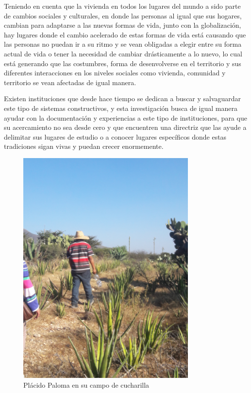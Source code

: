 Teniendo en cuenta que la vivienda en todos los lugares del mundo a sido parte de cambios sociales y culturales, en donde las personas al igual que sus hogares, cambian para adaptarse a las nuevas formas de vida, junto con la globalización, hay lugares donde el cambio acelerado de estas formas de vida está causando que las personas no puedan ir a su ritmo y se vean obligadas a elegir entre su forma actual de vida o tener la necesidad de cambiar drásticamente a lo nuevo, lo cual está generando que las costumbres, forma de desenvolverse en el territorio y sus diferentes interacciones en los niveles sociales como vivienda, comunidad y territorio se vean afectadas de igual manera.

Existen instituciones que desde hace tiempo se dedican a buscar y salvaguardar este tipo de sistemas constructivos, y esta investigación busca de igual manera ayudar con la documentación y experiencias a este tipo de instituciones, para que su acercamiento no sea desde cero y que encuentren una directriz que las ayude a delimitar sus lugares de estudio o a conocer lugares específicos donde estas tradiciones sigan vivas y puedan crecer enormemente.

\begin{figure}[ht]
    \center
    \includegraphics[width=0.8\textwidth, angle=-90]{../../imagenes/placido.jpg}
    \caption{Plácido Paloma en su campo de cucharilla}
\end{figure}
